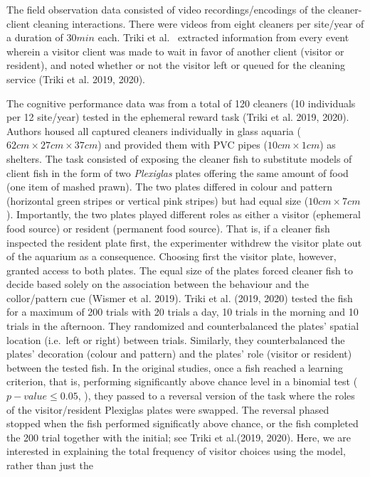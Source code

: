 \documentclass[
  12pt,
]{article}
\begin{document}
The field observation data consisted of video recordings/encodings of
the cleaner-client cleaning interactions. There were videos from eight
cleaners per site/year of a duration of \(30 min\) each. Triki et al.~
extracted information from every event wherein a visitor client was made
to wait in favor of another client (visitor or resident), and noted
whether or not the visitor left or queued for the cleaning service
(Triki et al. 2019, 2020).

The cognitive performance data was from a total of 120 cleaners (10
individuals per 12 site/year) tested in the ephemeral reward task (Triki
et al. 2019, 2020). Authors housed all captured cleaners individually in
glass aquaria (\(62cm \times 27cm \times 37 cm\)) and provided them with
PVC pipes (\(10 cm \times 1 cm\)) as shelters. The task consisted of
exposing the cleaner fish to substitute models of client fish in the
form of two \emph{Plexiglas} plates offering the same amount of food
(one item of mashed prawn). The two plates differed in colour and
pattern (horizontal green stripes or vertical pink stripes) but had
equal size (\(10 cm \times 7 cm\)). Importantly, the two plates played
different roles as either a visitor (ephemeral food source) or resident
(permanent food source). That is, if a cleaner fish inspected the
resident plate first, the experimenter withdrew the visitor plate out of
the aquarium as a consequence. Choosing first the visitor plate,
however, granted access to both plates. The equal size of the plates
forced cleaner fish to decide based solely on the association between
the behaviour and the collor/pattern cue (Wismer et al. 2019). Triki et
al. (2019, 2020) tested the fish for a maximum of 200 trials with 20
trials a day, 10 trials in the morning and 10 trials in the afternoon.
They randomized and counterbalanced the plates' spatial location
(i.e.~left or right) between trials. Similarly, they counterbalanced the
plates' decoration (colour and pattern) and the plates' role (visitor or
resident) between the tested fish. In the original studies, once a fish
reached a learning criterion, that is, performing significantly above
chance level in a binomial test (\(p-value \leq 0.05\), ), they passed
to a reversal version of the task where the roles of the
visitor/resident Plexiglas plates were swapped. The reversal phased
stopped when the fish performed significatly above chance, or the fish
completed the 200 trial together with the initial; see Triki et
al.(2019, 2020). Here, we are interested in explaining the total
frequency of visitor choices using the model, rather than just the
\end{document}
